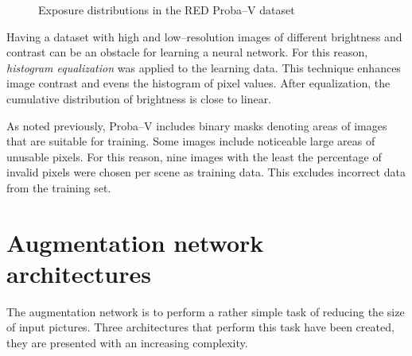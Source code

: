 \begin{figure}
        \centering
    \caption{Exposure distributions in the RED Proba--V dataset}
    \label{fig:exposure-dist-red}
\end{figure}


Having a dataset with high and low--resolution images of different brightness and contrast can be an obstacle for learning a neural network.
For this reason, \textit{histogram equalization} was applied to the learning data.
This technique enhances image contrast and evens the histogram of pixel values.
After equalization, the cumulative distribution of brightness is close to linear.

As noted previously, Proba--V includes binary masks denoting areas of images that are suitable for training.
Some images include noticeable large areas of unusable pixels.
For this reason, nine images with the least the percentage of invalid pixels were chosen per scene as training data.
This excludes incorrect data from the training set.  

\section{Augmentation network architectures}
The augmentation network is to perform a rather simple task of reducing the size of input pictures.
Three architectures that perform this task have been created, they are presented with an increasing complexity.

